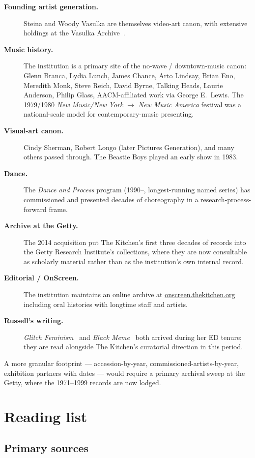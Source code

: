 \documentclass[10pt,letterpaper,twocolumn]{article}
\begin{document}
\begin{description}
\item[\textbf{Founding artist generation.}] Steina and Woody Vasulka are themselves video-art canon, with extensive holdings at the Vasulka Archive~\citep{vasulka_archive}.
\item[\textbf{Music history.}] The institution is a primary site of the no-wave / downtown-music canon: Glenn Branca, Lydia Lunch, James Chance, Arto Lindsay, Brian Eno, Meredith Monk, Steve Reich, David Byrne, Talking Heads, Laurie Anderson, Philip Glass, AACM-affiliated work via George E.~Lewis. The 1979/1980 \emph{New Music/New York} $\to$ \emph{New Music America} festival was a national-scale model for contemporary-music presenting.
\item[\textbf{Visual-art canon.}] Cindy Sherman, Robert Longo (later Pictures Generation), and many others passed through. The Beastie Boys played an early show in 1983.
\item[\textbf{Dance.}] The \emph{Dance and Process} program (1990--, longest-running named series) has commissioned and presented decades of choreography in a research-process-forward frame.
\item[\textbf{Archive at the Getty.}] The 2014 acquisition put The Kitchen's first three decades of records into the Getty Research Institute's collections, where they are now consultable as scholarly material rather than as the institution's own internal record.
\item[\textbf{Editorial / OnScreen.}] The institution maintains an online archive at \url{onscreen.thekitchen.org} including oral histories with longtime staff and artists.
\item[\textbf{Russell's writing.}] \emph{Glitch Feminism}~\citep{russell2020glitch} and \emph{Black Meme}~\citep{russell2024blackmeme} both arrived during her ED tenure; they are read alongside The Kitchen's curatorial direction in this period.
\end{description}

A more granular footprint --- accession-by-year, commissioned-artists-by-year, exhibition partners with dates --- would require a primary archival sweep at the Getty, where the 1971--1999 records are now lodged.

\section{Reading list}

\subsection{Primary sources}
\end{document}
